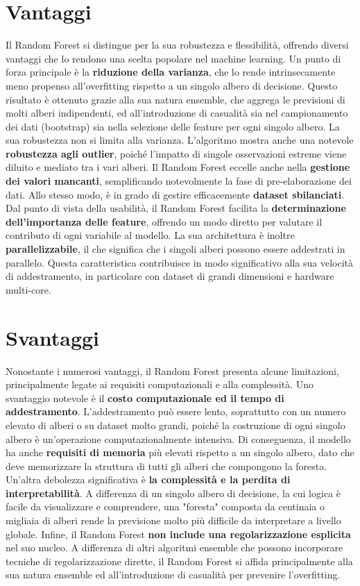\documentclass[a4paper,12pt]{report}
\begin{document}
	\section{Vantaggi}
	Il Random Forest si distingue per la sua robustezza e flessibilità, offrendo diversi vantaggi che lo rendono una scelta popolare nel machine learning. Un punto di forza principale è la \textbf{riduzione della varianza}, che lo rende intrinsecamente meno propenso all'overfitting rispetto a un singolo albero di decisione. Questo risultato è ottenuto grazie alla sua natura ensemble, che aggrega le previsioni di molti alberi indipendenti, ed all'introduzione di casualità sia nel campionamento dei dati (bootstrap) sia nella selezione delle feature per ogni singolo albero. La sua robustezza non si limita alla varianza. L'algoritmo mostra anche una notevole \textbf{robustezza agli outlier}, poiché l'impatto di singole osservazioni estreme viene diluito e mediato tra i vari alberi. Il Random Forest eccelle anche nella \textbf{gestione dei valori mancanti}, semplificando notevolmente la fase di pre-elaborazione dei dati. Allo stesso modo, è in grado di gestire efficacemente \textbf{dataset sbilanciati}. Dal punto di vista della usabilità, il Random Forest facilita la \textbf{determinazione dell'importanza delle feature}, offrendo un modo diretto per valutare il contributo di ogni variabile al modello. La sua architettura è inoltre \textbf{parallelizzabile}, il che significa che i singoli alberi possono essere addestrati in parallelo. Questa caratteristica contribuisce in modo significativo alla sua velocità di addestramento, in particolare con dataset di grandi dimensioni e hardware multi-core.
	
	\section{Svantaggi}
	Nonostante i numerosi vantaggi, il Random Forest presenta alcune limitazioni, principalmente legate ai requisiti computazionali e alla complessità. Uno svantaggio notevole è il \textbf{costo computazionale ed il tempo di addestramento}. L'addestramento può essere lento, soprattutto con un numero elevato di alberi o su dataset molto grandi, poiché la costruzione di ogni singolo albero è un'operazione computazionalmente intensiva. Di conseguenza, il modello ha anche \textbf{requisiti di memoria} più elevati rispetto a un singolo albero, dato che deve memorizzare la struttura di tutti gli alberi che compongono la foresta. Un'altra debolezza significativa è \textbf{la complessità e la perdita di interpretabilità}. A differenza di un singolo albero di decisione, la cui logica è facile da visualizzare e comprendere, una "foresta" composta da centinaia o migliaia di alberi rende la previsione molto più difficile da interpretare a livello globale. Infine, il Random Forest \textbf{non include una regolarizzazione esplicita} nel suo nucleo. A differenza di altri algoritmi ensemble che possono incorporare tecniche di regolarizzazione dirette, il Random Forest si affida principalmente alla sua natura ensemble ed all'introduzione di casualità per prevenire l'overfitting.
	
\end{document}
